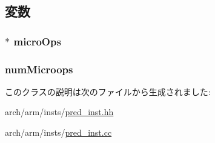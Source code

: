 \subsection{変数}
\hypertarget{classArmISA_1_1PredMacroOp_a824cafc0dae7c0bbc33402c635074879}{
\subsubsection[{microOps}]{$\ast$ {\bf microOps}}}
\label{classArmISA_1_1PredMacroOp_a824cafc0dae7c0bbc33402c635074879}
\hypertarget{classArmISA_1_1PredMacroOp_a19b588f64e88c4ef1ef5fd836415e6f5}{
\subsubsection[{numMicroops}]{ {\bf numMicroops}}}
\label{classArmISA_1_1PredMacroOp_a19b588f64e88c4ef1ef5fd836415e6f5}


このクラスの説明は次のファイルから生成されました:\begin{DoxyCompactItemize}
\item 
arch/arm/insts/\hyperlink{pred__inst_8hh}{pred\_\-inst.hh}\item 
arch/arm/insts/\hyperlink{pred__inst_8cc}{pred\_\-inst.cc}\end{DoxyCompactItemize}
